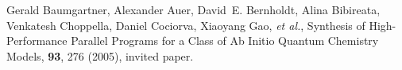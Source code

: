 \begin{thebiobibliography}{99}

Gerald Baumgartner, Alexander Auer, David~E. Bernholdt, Alina Bibireata,
Venkatesh Choppella, 
Daniel Cociorva, 
Xiaoyang Gao, 
\emph{et al.},
\newblock Synthesis of High-Performance Parallel Programs for a Class of Ab
  Initio Quantum Chemistry Models,
 {\bf 93}, 276 (2005),
\newblock invited paper.


\end{thebiobibliography}


